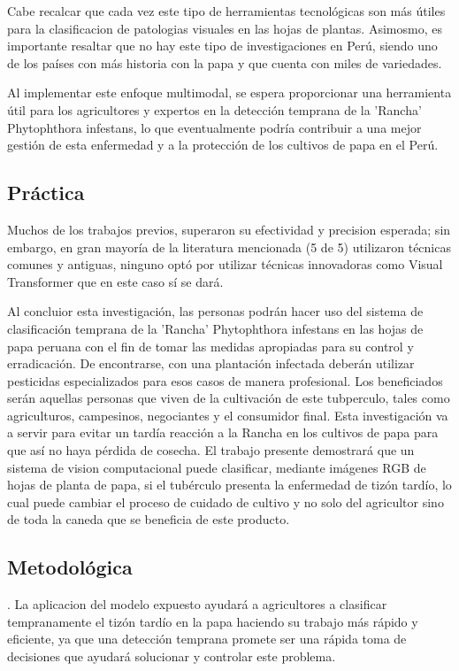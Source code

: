 Cabe recalcar que cada vez este tipo de herramientas tecnológicas son más útiles para la clasificacion de patologias visuales en las hojas de plantas. Asimosmo, es importante resaltar que no hay este tipo de investigaciones en Perú, siendo uno de los países con más historia con la papa y que cuenta con miles de variedades.

Al implementar este enfoque multimodal, se espera proporcionar una herramienta útil para los agricultores y expertos en la detección temprana de la 'Rancha' Phytophthora infestans, lo que eventualmente podría contribuir a una mejor gestión de esta enfermedad y a la protección de los cultivos de papa en el Perú. 
\subsection{Práctica}
Muchos de los trabajos previos, superaron su efectividad y precision esperada; sin embargo, en gran mayoría de la literatura mencionada (5 de 5) utilizaron técnicas comunes y antiguas, ninguno optó por utilizar técnicas innovadoras como Visual Transformer que en este caso sí se dará.


Al concluior esta investigación, las personas podrán hacer uso del sistema de clasificación temprana de la 'Rancha' Phytophthora infestans en las hojas de papa peruana con el fin de tomar las medidas apropiadas para su control y erradicación. De encontrarse, con una plantación infectada deberán utilizar pesticidas especializados para esos casos de manera profesional. Los beneficiados serán aquellas personas que viven de la cultivación de este tubperculo, tales como agriculturos, campesinos, negociantes y el consumidor final. Esta investigación va a servir para evitar un tardía reacción a la Rancha en los cultivos de papa para que así no haya pérdida de cosecha. El trabajo presente demostrará que un sistema de vision computacional puede clasificar, mediante imágenes RGB de hojas de planta de papa, si el tubérculo presenta la enfermedad de tizón tardío, lo cual puede cambiar el proceso de cuidado de cultivo y no solo del agricultor sino de toda la caneda que se beneficia de este producto.
\subsection{Metodológica}. 
La aplicacion del modelo expuesto ayudará a agricultores a clasificar tempranamente el tizón tardío en la papa haciendo su trabajo más rápido y eficiente, ya que una detección temprana promete ser una rápida toma de decisiones que ayudará solucionar y controlar este problema.


